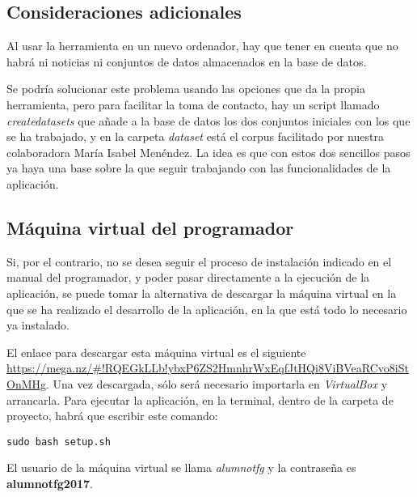 \subsection{Consideraciones adicionales}

Al usar la herramienta en un nuevo ordenador, hay que tener en cuenta que no habrá ni noticias ni conjuntos de datos almacenados en la base de datos. 

Se podría solucionar este problema usando las opciones que da la propia herramienta, pero para facilitar la toma de contacto, hay un script llamado \emph{createdatasets} que añade a la base de datos los dos conjuntos iniciales con los que se ha trabajado, y en la carpeta \emph{dataset} está el corpus facilitado por nuestra colaboradora María Isabel Menéndez. La idea es que con estos dos sencillos pasos ya haya una base sobre la que seguir trabajando con las funcionalidades de la aplicación.

\subsection{Máquina virtual del programador}

Si, por el contrario, no se desea seguir el proceso de instalación indicado en el manual del programador, y poder pasar directamente a la ejecución de la aplicación, se puede tomar la alternativa de descargar la máquina virtual en la que se ha realizado el desarrollo de la aplicación, en la que está todo lo necesario ya instalado.

El enlace para descargar esta máquina virtual es el siguiente \url{https://mega.nz/#!RQEGkLLb!ybxP6ZS2HmnhrWxEqfJtHQi8ViBVeaRCvo8iStOnMHg}. Una vez descargada, sólo será necesario importarla en \emph{VirtualBox} y arrancarla. Para ejecutar la aplicación, en la terminal, dentro de la carpeta de proyecto, habrá que escribir este comando:

\begin{verbatim}
sudo bash setup.sh
\end{verbatim}

El usuario de la máquina virtual se llama \emph{alumnotfg} y la contraseña es \textbf{alumnotfg2017}.